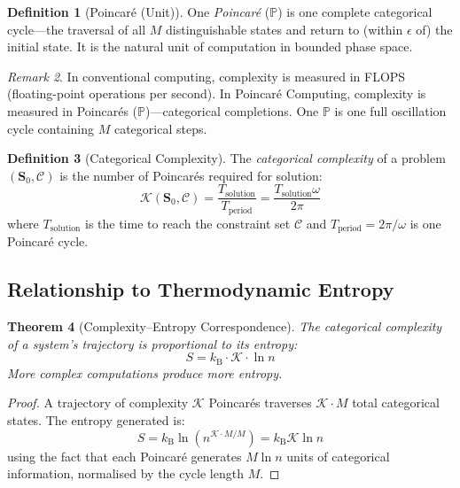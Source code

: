 \documentclass[twocolumn,10pt,a4paper]{article}
\theoremstyle{plain}
\newtheorem{theorem}{Theorem}[section]
\theoremstyle{definition}
\newtheorem{definition}[theorem]{Definition}
\theoremstyle{remark}
\newtheorem{remark}[theorem]{Remark}
\newcommand{\kB}{k_{\mathrm{B}}}
\newcommand{\Scoord}{\mathbf{S}}
\begin{document}
\begin{definition}[Poincar\'{e} (Unit)]
\label{def:poincare_unit}
One \emph{Poincar\'{e}} ($\mathbb{P}$) is one complete categorical cycle---the traversal of all $M$ distinguishable states and return to (within $\epsilon$ of) the initial state. It is the natural unit of computation in bounded phase space.
\end{definition}

\begin{remark}
In conventional computing, complexity is measured in FLOPS (floating-point operations per second). In Poincar\'{e} Computing, complexity is measured in Poincar\'{e}s ($\mathbb{P}$)---categorical completions. One $\mathbb{P}$ is one full oscillation cycle containing $M$ categorical steps.
\end{remark}

\begin{definition}[Categorical Complexity]
\label{def:complexity}
The \emph{categorical complexity} of a problem $(\Scoord_0, \mathcal{C})$ is the number of Poincar\'{e}s required for solution:
\begin{equation}
    \mathcal{K}(\Scoord_0, \mathcal{C}) = \frac{T_{\mathrm{solution}}}{T_{\mathrm{period}}} = \frac{T_{\mathrm{solution}} \omega}{2\pi}
\end{equation}
where $T_{\mathrm{solution}}$ is the time to reach the constraint set $\mathcal{C}$ and $T_{\mathrm{period}} = 2\pi/\omega$ is one Poincar\'{e} cycle.
\end{definition}

\subsection{Relationship to Thermodynamic Entropy}

\begin{theorem}[Complexity--Entropy Correspondence]
\label{thm:complexity_entropy}
The categorical complexity of a system's trajectory is proportional to its entropy:
\begin{equation}
    S = \kB \cdot \mathcal{K} \cdot \ln n
\end{equation}
More complex computations produce more entropy.
\end{theorem}

\begin{proof}
A trajectory of complexity $\mathcal{K}$ Poincar\'{e}s traverses $\mathcal{K} \cdot M$ total categorical states. The entropy generated is:
\begin{equation}
    S = \kB \ln(n^{\mathcal{K} \cdot M/M}) = \kB \mathcal{K} \ln n
\end{equation}
using the fact that each Poincar\'{e} generates $M \ln n$ units of categorical information, normalised by the cycle length $M$.
\end{proof}
\end{document}
